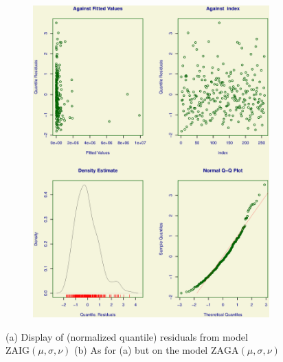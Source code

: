 \documentclass{DissertateUSU}
\begin{document}
\begin{figure}
\begin{subfigure}[b]{0.5\textwidth}
   \includegraphics[width=1\linewidth]{ROC_4Plot_ZAGA.eps}
   \caption{}
   \label{Residuals_ZAGA}
\end{subfigure}

\caption[Normalized quantile residuals from models ZAIG \& ZAGA]{(a) Display of (normalized quantile) residuals from model $\mbox{ZAIG}(\mu,\sigma,\nu)$ (b) As for (a) but on the model $\mbox{ZAGA}(\mu,\sigma,\nu)$}
\end{figure}


\end{document}
